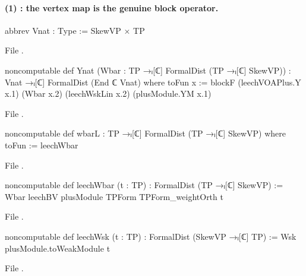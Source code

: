\paragraph{(1) : the vertex map is the genuine block operator.}
\begin{leancode}
abbrev Vnat : Type := SkewVP × TP
\end{leancode}
File .
\begin{leancode}
noncomputable def Ynat (Wbar : TP →ₗ[ℂ] FormalDist (TP →ₗ[ℂ] SkewVP)) :
    Vnat →ₗ[ℂ] FormalDist (End ℂ Vnat) where
  toFun x := blockF (leechVOAPlus.Y x.1) (Wbar x.2) (leechWskLin x.2) (plusModule.YM x.1)
\end{leancode}
File .
\begin{leancode}
noncomputable def wbarL : TP →ₗ[ℂ] FormalDist (TP →ₗ[ℂ] SkewVP) where
  toFun := leechWbar
\end{leancode}
File .
\begin{leancode}
noncomputable def leechWbar (t : TP) : FormalDist (TP →ₗ[ℂ] SkewVP) :=
  Wbar leechBV plusModule TPForm TPForm_weightOrth t
\end{leancode}
File .
\begin{leancode}
noncomputable def leechWsk (t : TP) : FormalDist (SkewVP →ₗ[ℂ] TP) :=
  Wsk plusModule.toWeakModule t
\end{leancode}
File .

